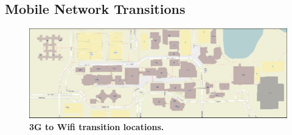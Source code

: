 \subsection{Mobile Network Transitions}
\label{subsec-networktransitions}

\begin{figure}[t]
\includegraphics[width=\textwidth]{./figures/networking/transition_locations/graph.pdf}
\caption{\textbf{3G to Wifi transition locations.}}
\end{figure}
